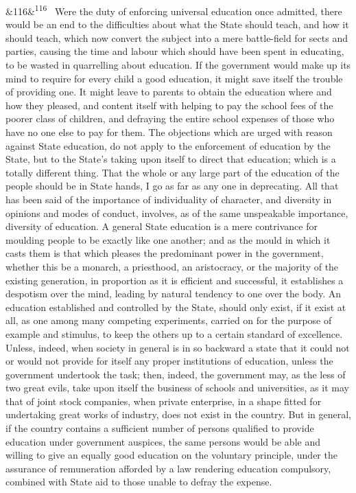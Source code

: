 \documentclass[12pt]{article}
\newcommand{\para}[1][]{\par\noindent\ifx&#1&\else\textsuperscript{\footnotesize #1}~\fi}
\begin{document}
\para[116] Were the duty of enforcing universal education once admitted, there would be an end to the difficulties about what the State should teach, and how it should teach, which now convert the subject into a mere battle-field for sects and parties, causing the time and labour which should have been spent in educating, to be wasted in quarrelling about education. If the government would make up its mind to require for every child a good education, it might save itself the trouble of providing one. It might leave to parents to obtain the education where and how they pleased, and content itself with helping to pay the school fees of the poorer class of children, and defraying the entire school expenses of those who have no one else to pay for them. The objections which are urged with reason against State education, do not apply to the enforcement of education by the State, but to the State's taking upon itself to direct that education; which is a totally different thing. That the whole or any large part of the education of the people should be in State hands, I go as far as any one in deprecating. All that has been said of the importance of individuality of character, and diversity in opinions and modes of conduct, involves, as of the same unspeakable importance, diversity of education. A general State education is a mere contrivance for moulding people to be exactly like one another; and as the mould in which it casts them is that which pleases the predominant power in the government, whether this be a monarch, a priesthood, an aristocracy, or the majority of the existing generation, in proportion as it is efficient and successful, it establishes a despotism over the mind, leading by natural tendency to one over the body. An education established and controlled by the State, should only exist, if it exist at all, as one among many competing experiments, carried on for the purpose of example and stimulus, to keep the others up to a certain standard of excellence. Unless, indeed, when society in general is in so backward a state that it could not or would not provide for itself any proper institutions of education, unless the government undertook the task; then, indeed, the government may, as the less of two great evils, take upon itself the business of schools and universities, as it may that of joint stock companies, when private enterprise, in a shape fitted for undertaking great works of industry, does not exist in the country. But in general, if the country contains a sufficient number of persons qualified to provide education under government auspices, the same persons would be able and willing to give an equally good education on the voluntary principle, under the assurance of remuneration afforded by a law rendering education compulsory, combined with State aid to those unable to defray the expense.
\end{document}
